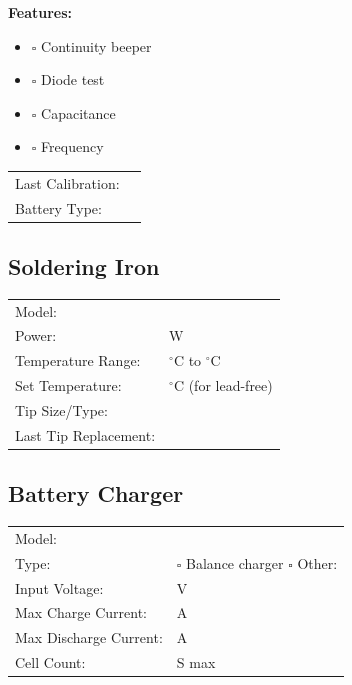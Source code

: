 \documentclass[10pt,letterpaper]{article}
\begin{document}
\textbf{Features:}
\begin{itemize}[nosep]
\item $\square$ Continuity beeper
\item $\square$ Diode test
\item $\square$ Capacitance
\item $\square$ Frequency
\end{itemize}

\begin{tabularx}{\textwidth}{lX}
Last Calibration: & \underline{\hspace{4cm}} \\
Battery Type: & \underline{\hspace{4cm}} \\
\end{tabularx}

\subsection*{Soldering Iron}
\begin{tabularx}{\textwidth}{lX}
Model: & \underline{\hspace{8cm}} \\
Power: & \underline{\hspace{3cm}} W \\
Temperature Range: & \underline{\hspace{2cm}} $^\circ$C to \underline{\hspace{2cm}} $^\circ$C \\
Set Temperature: & \underline{\hspace{3cm}} $^\circ$C (for lead-free) \\
Tip Size/Type: & \underline{\hspace{6cm}} \\[0.5em]
Last Tip Replacement: & \underline{\hspace{4cm}} \\
\end{tabularx}

\subsection*{Battery Charger}
\begin{tabularx}{\textwidth}{lX}
Model: & \underline{\hspace{8cm}} \\
Type: & $\square$ Balance charger $\square$ Other: \underline{\hspace{3cm}} \\
Input Voltage: & \underline{\hspace{3cm}} V \\
Max Charge Current: & \underline{\hspace{3cm}} A \\
Max Discharge Current: & \underline{\hspace{3cm}} A \\
Cell Count: & \underline{\hspace{3cm}} S max \\
\end{tabularx}
\end{document}
